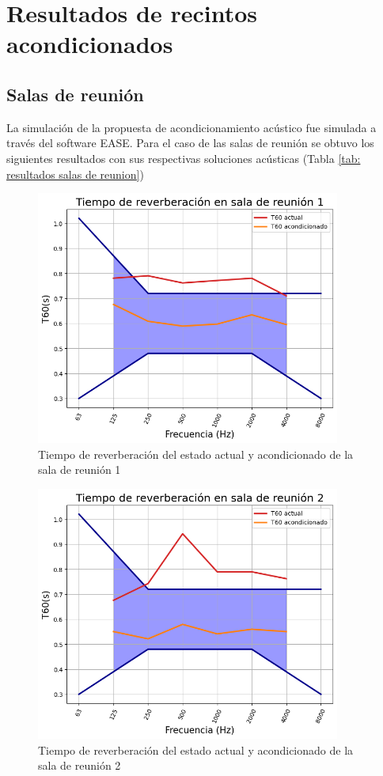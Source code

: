 \section{Resultados de recintos acondicionados}
\subsection{Salas de reunión}
La simulación de la propuesta de acondicionamiento acústico fue simulada a través del software EASE. Para el caso de las salas de reunión se obtuvo los siguientes resultados con sus respectivas soluciones acústicas (Tabla \ref{tab: resultados salas de reunion})
\begin{figure}[H]
    \centering
    \includegraphics[width=10cm]{Imagenes/DIN/DIN sala reunion 1 comparacion.png}
    \caption{Tiempo de reverberación del estado actual y acondicionado de la sala de reunión 1}
    \label{fig: Ttarger sala_reunion 1 acond}
\end{figure}
\begin{figure}[H]
    \centering
    \includegraphics[width=10cm]{Imagenes/DIN/DIN sala reunion 2 comparacion.png}
    \caption{Tiempo de reverberación del estado actual y acondicionado de la sala de reunión 2}
    \label{fig: Ttarger sala_reunion 2 acond}
\end{figure}

